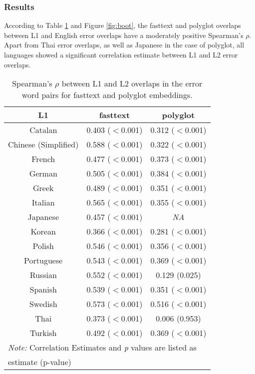 \documentclass[10pt,letterpaper]{article}
\begin{document}
\subsubsection{Results} 
According to Table \ref{tab:hyp1} and Figure \ref{fig:boot}, the fasttext and polyglot overlaps between L1 and English error overlaps have a moderately positive Spearman's $\rho$. Apart from Thai error overlaps, as well as Japanese in the case of polyglot, all languages showed a significant correlation estimate between L1 and L2 error overlaps. 
\begin{table}[H]
\caption{\label{tab:hyp1}Spearman's $\rho$ between L1 and L2 overlaps in the error word pairs for fasttext and polyglot embeddings.}
\begin{center}
    \begin{tabular}{|c|c|c|}
\toprule
\hline
\textbf{L1} & \textbf{fasttext} & \textbf{polyglot}\\
\midrule
\hline
Catalan & 0.403 ($<$0.001) & 0.312 ($<$0.001)\\
Chinese (Simplified) & 0.588 ($<$0.001) & 0.322 ($<$0.001)\\
French & 0.477 ($<$0.001) & 0.373 ($<$0.001)\\
German & 0.505 ($<$0.001) & 0.384 ($<$0.001)\\
Greek & 0.489 ($<$0.001) & 0.351 ($<$0.001)\\
\addlinespace
Italian & 0.565 ($<$0.001) & 0.355 ($<$0.001)\\
Japanese & 0.457 ($<$0.001) & \textit{NA}\\
Korean & 0.366 ($<$0.001) & 0.281 ($<$0.001)\\
Polish & 0.546 ($<$0.001) & 0.356 ($<$0.001)\\
Portuguese & 0.543 ($<$0.001) & 0.369 ($<$0.001)\\
Russian & 0.552 ($<$0.001) & 0.129 (0.025)\\
\addlinespace
Spanish & 0.539 ($<$0.001) & 0.351 ($<$0.001)\\
Swedish & 0.573 ($<$0.001) & 0.516 ($<$0.001)\\
Thai & 0.373 ($<$0.001) & 0.006 (0.953)\\
Turkish & 0.492 ($<$0.001) & 0.369 ($<$0.001)\\
\bottomrule
\hline
\multicolumn{3}{l}{\textit{Note:} Correlation Estimates and \textit{p} values are listed as}\\
\multicolumn{3}{l}{estimate (p-value)}
\end{tabular}
\end{center}
\end{table}
\end{document}
